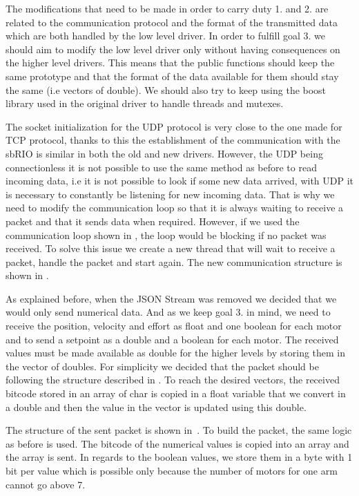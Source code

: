 The modifications that need to be made in order to carry duty 1. and 2. are related to the communication protocol and the format of the transmitted data which are both handled by the low level driver. In order to fulfill goal 3. we should aim to modify the low level driver only without having consequences on the higher level drivers. This means that the public functions should keep the same prototype and that the format of the data available for them should stay the same (i.e vectors of double). We should also try to keep using the boost library used in the original driver to handle threads and mutexes.

The socket initialization for the UDP protocol is very close to the one made for TCP protocol, thanks to this the establishment of the communication with the sbRIO is similar in both the old and new drivers. However, the UDP being connectionless it is not possible to use the same method as before to read incoming data, i.e it is not possible to look if some new data arrived, with UDP it is necessary to constantly be listening for new incoming data. That is why we need to modify the communication loop so that it is always waiting to receive a packet and that it sends data when required. However, if we used the communication loop shown in , the loop would be blocking if no packet was received. To solve this issue we create a new thread that will wait to receive a packet, handle the packet and start again. The new communication structure is shown in .

As explained before, when the JSON Stream was removed we decided that we would only send numerical data. And as we keep goal 3. in mind, we need to receive the position, velocity and effort as float and one boolean for each motor and to send a setpoint as a double and a boolean for each motor. The received values must be made available as double for the higher levels by storing them in the vector of doubles. For simplicity we decided that the packet should be following the structure described in . To reach the desired vectors, the received bitcode stored in an array of char is copied in a float variable that we convert in a double and then the value in the vector is updated using this double.

The structure of the sent packet is shown in~. To build the packet, the same logic as before is used. The bitcode of the numerical values is copied into an array and the array is sent.
In regards to the boolean values, we store them in a byte with 1 bit per value which is possible only because the number of motors for one arm cannot go above 7.

